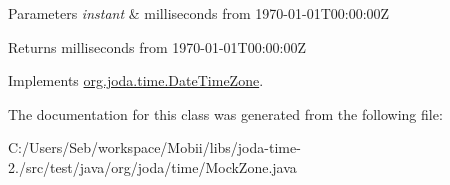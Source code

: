 \begin{DoxyParams}{Parameters}
{\em instant} & milliseconds from 1970-\/01-\/01\-T00\-:00\-:00\-Z \\
\hline
\end{DoxyParams}
\begin{DoxyReturn}{Returns}
milliseconds from 1970-\/01-\/01\-T00\-:00\-:00\-Z 
\end{DoxyReturn}


Implements \hyperlink{classorg_1_1joda_1_1time_1_1_date_time_zone_abdb3c6d6191fdd441248a7ea8ca302d0}{org.\-joda.\-time.\-Date\-Time\-Zone}.



The documentation for this class was generated from the following file\-:\begin{DoxyCompactItemize}
\item 
C\-:/\-Users/\-Seb/workspace/\-Mobii/libs/joda-\/time-\/2./src/test/java/org/joda/time/Mock\-Zone.\-java\end{DoxyCompactItemize}
